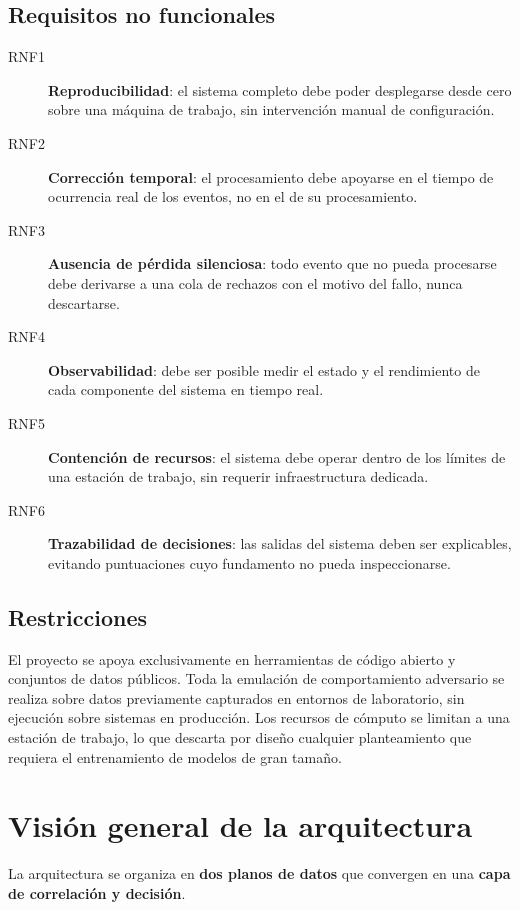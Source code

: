 \subsection{Requisitos no funcionales}

\begin{description}
    \item[RNF1] \textbf{Reproducibilidad}: el sistema completo debe poder desplegarse desde
    cero sobre una máquina de trabajo, sin intervención manual de configuración.
    \item[RNF2] \textbf{Corrección temporal}: el procesamiento debe apoyarse en el tiempo de
    ocurrencia real de los eventos, no en el de su procesamiento.
    \item[RNF3] \textbf{Ausencia de pérdida silenciosa}: todo evento que no pueda procesarse
    debe derivarse a una cola de rechazos con el motivo del fallo, nunca descartarse.
    \item[RNF4] \textbf{Observabilidad}: debe ser posible medir el estado y el rendimiento de
    cada componente del sistema en tiempo real.
    \item[RNF5] \textbf{Contención de recursos}: el sistema debe operar dentro de los límites
    de una estación de trabajo, sin requerir infraestructura dedicada.
    \item[RNF6] \textbf{Trazabilidad de decisiones}: las salidas del sistema deben ser
    explicables, evitando puntuaciones cuyo fundamento no pueda inspeccionarse.
\end{description}

\subsection{Restricciones}

El proyecto se apoya exclusivamente en herramientas de código abierto y conjuntos de datos
públicos. Toda la emulación de comportamiento adversario se realiza sobre datos previamente
capturados en entornos de laboratorio, sin ejecución sobre sistemas en producción. Los
recursos de cómputo se limitan a una estación de trabajo, lo que descarta por diseño
cualquier planteamiento que requiera el entrenamiento de modelos de gran tamaño.

\section{Visión general de la arquitectura}

La arquitectura se organiza en \textbf{dos planos de datos} que convergen en una
\textbf{capa de correlación y decisión}.

